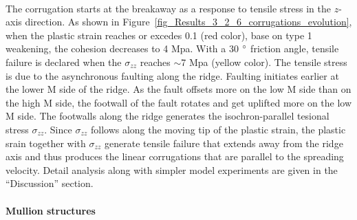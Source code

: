 ~\\
The corrugation starts at the breakaway as a response to tensile stress in the $z$-axis direction. As shown in Figure~\hyperref[fig_Results_3_2_6_corrugations_evolution]{\ref{fig_Results_3_2_6_corrugations_evolution}}, when the plastic strain reaches or excedes 0.1 (red color), base on type 1 weakening, the cohesion decreases to 4 Mpa. With a 30 $\degree$ friction angle, tensile failure is declared when the $\sigma_{zz}$ reaches $\sim$7 Mpa (yellow color).
The tensile stress is due to the asynchronous faulting along the ridge. Faulting initiates earlier at the lower M side of the ridge. As the fault offsets more on the low M side than on the high M side, the footwall of the fault rotates and get uplifted more on the low M side. The footwalls along the ridge generates the isochron-parallel tesional stress $\sigma_{zz}$. Since $\sigma_{zz}$ follows along the moving tip of the plastic strain, the plastic srain together with $\sigma_{zz}$ generate tensile failure that extends away from the ridge axis and thus produces the linear corrugations that are parallel to the spreading velocity. Detail analysis along with simpler model experiments are given in the ``Discussion'' section.   

\paragraph{Mullion structures}

